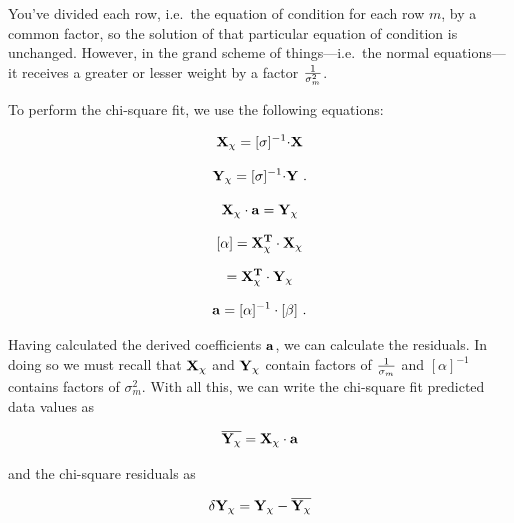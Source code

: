 \documentclass[psfig,preprint]{aastex}
\begin{document}
\noindent You've divided each row, i.e.\ the equation of condition for
each row $m$, by a common factor, so the solution of that particular
equation of condition is unchanged. However, in the grand scheme of
things---i.e.\ the normal equations---it receives a greater or lesser
weight by a factor ${1 \over \sigma_m^2}$.

	
	To perform the chi-square fit, we use the following equations:

\begin{mathletters} \label{matrixcalcs}
\begin{equation}
{\bf X_\chi} =  [\sigma]^{-1} {\bf \cdot X} 
\end{equation}

\begin{equation}
{\bf Y_\chi} =   [\sigma]^{-1} {\bf \cdot Y} \ .
\end{equation}

\begin{equation}
{\bf X_\chi \cdot a} = {\bf Y_\chi}
\end{equation}

\begin{equation} \label{curvmatrixalpha}
[\alpha]  =  {\bf X_\chi^T \cdot X_\chi}
\end{equation}

\begin{equation}
[\beta] = {\bf X_\chi^T \cdot Y_\chi}
\end{equation}

\begin{equation} \label{a_equation}
{\bf a} = [\alpha]^{-1} \cdot [\beta] \ .
\end{equation}

\noindent Having calculated the derived coefficients $\bf a$, we can
calculate the residuals.  In doing so we must recall that $\bf X_\chi$
and $\bf Y_\chi$ contain factors of $1 \over \sigma_m$ and
$[\alpha]^{-1}$ contains factors of $\sigma_m^2$.  With all this, we can
write the chi-square fit predicted data values as

\begin{equation}
\overline {\bf Y_\chi} = {\bf X_\chi \cdot a}
\end{equation}

\noindent and the chi-square residuals as

\begin{equation} 
\delta {\bf Y_\chi} = {\bf Y_\chi} -  \overline {\bf Y_\chi} 
\end{equation}


\end{mathletters}
\end{document}
